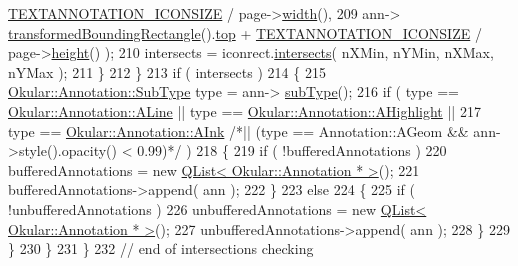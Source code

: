 \begin{DoxyCode}
      \hyperlink{pagepainter_8cpp_a32fe52c433b27892263587c64567dc5a}{TEXTANNOTATION\_ICONSIZE} / page->\hyperlink{classOkular_1_1Page_a57114e88281da2a51b1bb0d5d4996d53}{width}(),
209                                                          ann->
      \hyperlink{classOkular_1_1Annotation_a950ea9c7993878729eb4b6b0ea922436}{transformedBoundingRectangle}().\hyperlink{classOkular_1_1NormalizedRect_acfb70f6417c993508d50090b512cb954}{top} + 
      \hyperlink{pagepainter_8cpp_a32fe52c433b27892263587c64567dc5a}{TEXTANNOTATION\_ICONSIZE} / page->\hyperlink{classOkular_1_1Page_a67246a32b3e625946eb5c685b8372a4f}{height}() );
210                         intersects = iconrect.\hyperlink{classOkular_1_1NormalizedRect_a9c2d89ccafd17802316c90406c6ec756}{intersects}( nXMin, nYMin, nXMax, nYMax );
211                     \}
212                 \}
213                 \textcolor{keywordflow}{if} ( intersects )
214                 \{
215                     \hyperlink{classOkular_1_1Annotation_af71b46e37d5f850b97d5c4de3be9aac0}{Okular::Annotation::SubType} type = ann->
      \hyperlink{classOkular_1_1Annotation_af9833449767eacd740f377e69a1fdd48}{subType}();
216                     \textcolor{keywordflow}{if} ( type == \hyperlink{classOkular_1_1Annotation_af71b46e37d5f850b97d5c4de3be9aac0a7035dc978d8b79958f34e3d164838726}{Okular::Annotation::ALine} || type == 
      \hyperlink{classOkular_1_1Annotation_af71b46e37d5f850b97d5c4de3be9aac0a03e002f9ae62005b2d7c7f1445507501}{Okular::Annotation::AHighlight} ||
217                          type == \hyperlink{classOkular_1_1Annotation_af71b46e37d5f850b97d5c4de3be9aac0a4ed60063584ceb146c2a378f0df4ed37}{Okular::Annotation::AInk}  \textcolor{comment}{/*|| (type ==
       Annotation::AGeom && ann->style().opacity() < 0.99)*/} )
218                     \{
219                         \textcolor{keywordflow}{if} ( !bufferedAnnotations )
220                             bufferedAnnotations = \textcolor{keyword}{new} 
      \hyperlink{classQList}{QList< Okular::Annotation * >}();
221                         bufferedAnnotations->append( ann );
222                     \}
223                     \textcolor{keywordflow}{else}
224                     \{
225                         \textcolor{keywordflow}{if} ( !unbufferedAnnotations )
226                             unbufferedAnnotations = \textcolor{keyword}{new} 
      \hyperlink{classQList}{QList< Okular::Annotation * >}();
227                         unbufferedAnnotations->append( ann );
228                     \}
229                 \}
230             \}
231         \}
232         \textcolor{comment}{// end of intersections checking}

\end{DoxyCode}
